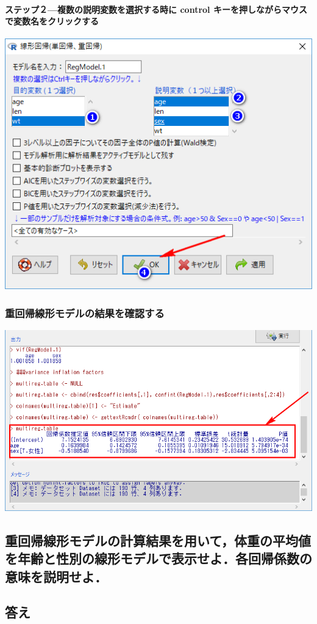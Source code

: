 \documentclass[11pt,]{problemset}
\let\oldparagraph\paragraph
\renewcommand{\paragraph}[1]{\oldparagraph{#1}\mbox{}}
\begin{document}
\hypertarget{-control-}{%
\paragraph{ステップ２---複数の説明変数を選択する時に control
キーを押しながらマウスで変数名をクリックする}\label{-control-}}

\begin{center}\includegraphics[width=0.4\linewidth]{pic/lm04} \end{center}

\newpage
\vfill

\subsubsection{重回帰線形モデルの結果を確認する}

\begin{center}\includegraphics[width=0.8\linewidth]{pic/lm05} \end{center}

\subsection{重回帰線形モデルの計算結果を用いて，体重の平均値を年齢と性別の線形モデルで表示せよ．各回帰係数の意味を説明せよ．}

\hypertarget{-4}{%
\subsection{答え}\label{-4}}
\end{document}
